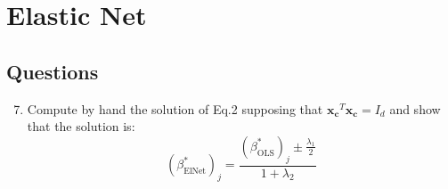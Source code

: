\documentclass{article}
\begin{document}
    \section*{Elastic Net}

    \subsection*{Questions}
    \begin{enumerate}
        \setcounter{enumi}{6}

        \item Compute by hand the solution of Eq.2 supposing that $\mathbf{x_c}^T \mathbf{x_c} = I_d$ and show that the solution is: 
        \[
            {(\beta^*_{\text{ElNet}})}_j = \frac{{(\beta^*_{\text{OLS}})}_j \pm \frac{\lambda_1}{2}}{1 + \lambda_2}
        \]
    \end{enumerate}
\end{document}
